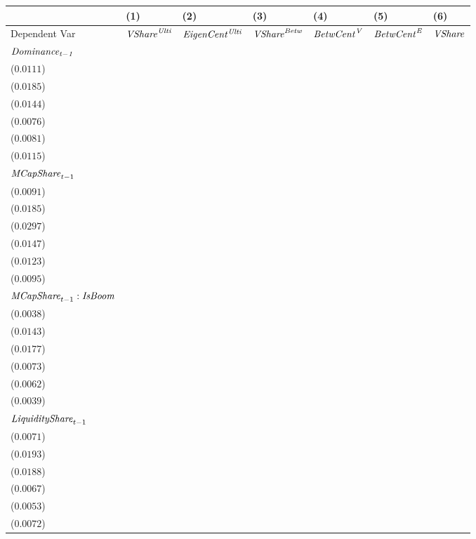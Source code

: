 \begin{tabular}{lllllll}
\toprule
 & (1) & (2) & (3) & (4) & (5) & (6) \\
\midrule
Dependent Var & ${\it {VShare}^{\it Ulti}}$ & ${\it EigenCent^{\it Ulti}}$ & ${\it VShare}^{\it Betw}$ & ${\it BetwCent}^{\it V}$ & ${\it BetwCent}^{\it E}$ & ${\it VShare}$ \\
$\it Dominance_{t-1}$ & \makecell{$0.8435^{***}$ \\ ($0.0111$)} & \makecell{$0.7688^{***}$ \\ ($0.0185$)} & \makecell{$0.8594^{***}$ \\ ($0.0144$)} & \makecell{$0.9422^{***}$ \\ ($0.0076$)} & \makecell{$0.9429^{***}$ \\ ($0.0081$)} & \makecell{$0.8430^{***}$ \\ ($0.0115$)} \\
${\it MCapShare}_{t-1}$ & \makecell{$0.0261^{***}$ \\ ($0.0091$)} & \makecell{$0.0328^{*}$ \\ ($0.0185$)} & \makecell{$0.0032^{}$ \\ ($0.0297$)} & \makecell{$0.0298^{**}$ \\ ($0.0147$)} & \makecell{$0.0351^{***}$ \\ ($0.0123$)} & \makecell{$0.0192^{**}$ \\ ($0.0095$)} \\
${\it MCapShare}_{t-1}:{\it IsBoom}$ & \makecell{$0.0051^{}$ \\ ($0.0038$)} & \makecell{$-0.0097^{}$ \\ ($0.0143$)} & \makecell{$0.0625^{***}$ \\ ($0.0177$)} & \makecell{$0.0196^{***}$ \\ ($0.0073$)} & \makecell{$0.0092^{}$ \\ ($0.0062$)} & \makecell{$0.0124^{***}$ \\ ($0.0039$)} \\
${\it LiquidityShare}_{t-1}$ & \makecell{$0.0367^{***}$ \\ ($0.0071$)} & \makecell{$0.0401^{**}$ \\ ($0.0193$)} & \makecell{$0.1196^{***}$ \\ ($0.0188$)} & \makecell{$0.0212^{***}$ \\ ($0.0067$)} & \makecell{$0.0185^{***}$ \\ ($0.0053$)} & \makecell{$0.0447^{***}$ \\ ($0.0072$)} \\

\end{tabular}
